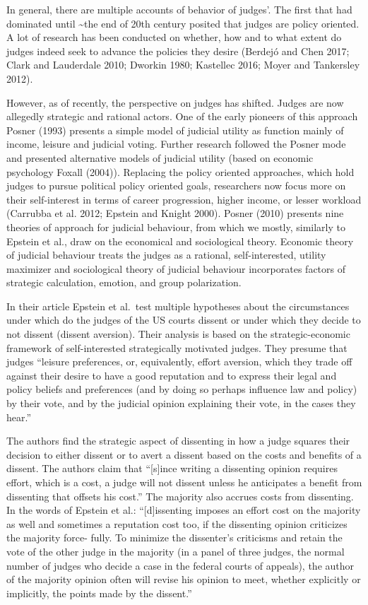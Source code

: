 \documentclass[
  11pt,
]{article}
\begin{document}
In general, there are multiple accounts of behavior of judges'. The
first that had dominated until \textasciitilde the end of 20th century
posited that judges are policy oriented. A lot of research has been
conducted on whether, how and to what extent do judges indeed seek to
advance the policies they desire (Berdejó and Chen 2017; Clark and
Lauderdale 2010; Dworkin 1980; Kastellec 2016; Moyer and Tankersley
2012).

However, as of recently, the perspective on judges has shifted. Judges
are now allegedly strategic and rational actors. One of the early
pioneers of this approach Posner (1993) presents a simple model of
judicial utility as function mainly of income, leisure and judicial
voting. Further research followed the Posner mode and presented
alternative models of judicial utility (based on economic psychology
Foxall (2004)). Replacing the policy oriented approaches, which hold
judges to pursue political policy oriented goals, researchers now focus
more on their self-interest in terms of career progression, higher
income, or lesser workload (Carrubba et al. 2012; Epstein and Knight
2000). Posner (2010) presents nine theories of approach for judicial
behaviour, from which we mostly, similarly to Epstein et al., draw on
the economical and sociological theory. Economic theory of judicial
behaviour treats the judges as a rational, self-interested, utility
maximizer and sociological theory of judicial behaviour incorporates
factors of strategic calculation, emotion, and group polarization.

In their article Epstein et al.~test multiple hypotheses about the
circumstances under which do the judges of the US courts dissent or
under which they decide to not dissent (dissent aversion). Their
analysis is based on the strategic-economic framework of self-interested
strategically motivated judges. They presume that judges ``leisure
preferences, or, equivalently, effort aversion, which they trade off
against their desire to have a good reputation and to express their
legal and policy beliefs and preferences (and by doing so perhaps
influence law and policy) by their vote, and by the judicial opinion
explaining their vote, in the cases they hear.''

The authors find the strategic aspect of dissenting in how a judge
squares their decision to either dissent or to avert a dissent based on
the costs and benefits of a dissent. The authors claim that
``{[}s{]}ince writing a dissenting opinion requires effort, which is a
cost, a judge will not dissent unless he anticipates a benefit from
dissenting that offsets his cost.'' The majority also accrues costs from
dissenting. In the words of Epstein et al.: ``{[}d{]}issenting imposes
an effort cost on the majority as well and sometimes a reputation cost
too, if the dissenting opinion criticizes the majority force- fully. To
minimize the dissenter's criticisms and retain the vote of the other
judge in the majority (in a panel of three judges, the normal number of
judges who decide a case in the federal courts of appeals), the author
of the majority opinion often will revise his opinion to meet, whether
explicitly or implicitly, the points made by the dissent.''
\end{document}
